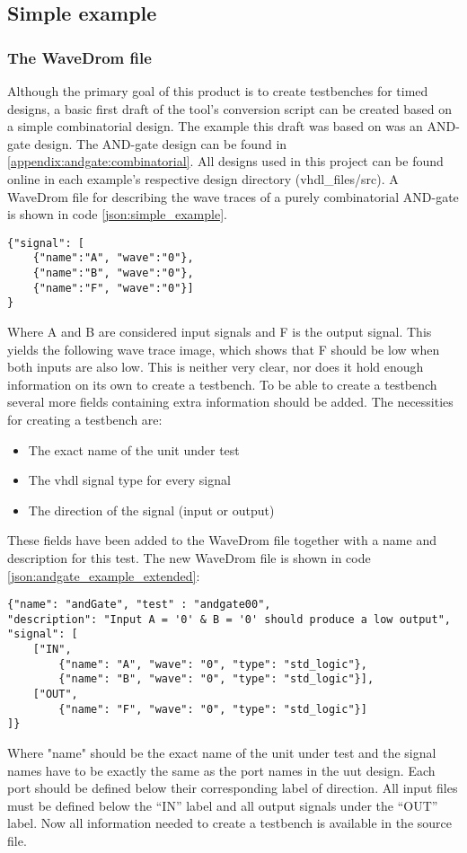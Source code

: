 \subsection{Simple example}
\subsubsection{The WaveDrom file}
Although the primary goal of this product is to create testbenches for timed designs, a basic first draft of the tool's conversion script can be created based on a simple combinatorial design.
\npar
The example this draft was based on was an AND-gate design. The AND-gate design can be found in \ref{appendix:andgate:combinatorial}. All designs used in this project can be found online \cite{examples} in each example's respective design directory (vhdl\_files/src).
\npar
A WaveDrom file for describing the wave traces of a purely combinatorial AND-gate is shown in code \ref{json:simple_example}.
\begin{lstlisting}[style=json, caption={Standard WaveDrom description for a combinatorial AND-gate}, label={json:simple_example}]
{"signal": [
	{"name":"A", "wave":"0"},
	{"name":"B", "wave":"0"},
	{"name":"F", "wave":"0"}]  
}
\end{lstlisting}\noindent
Where A and B are considered input signals and F is the output signal. This yields the following wave trace image, which shows that F should be low when both inputs are also low.%
This is neither very clear, nor does it hold enough information on its own to create a testbench.
To be able to create a testbench several more fields containing extra information should be added.
\npar
The necessities for creating a testbench are:
\begin{itemize}
	\item The exact name of the unit under test
	\item The vhdl signal type for every signal
	\item The direction of the signal (input or output)
\end{itemize}\noindent
These fields have been added to the WaveDrom file together with a name and description for this test. The new WaveDrom file is shown in code \ref{json:andgate_example_extended}:\newpage
\begin{lstlisting}[style=json, caption={Extended WaveDrom description for a combinatorial AND-gate}, label={json:andgate_example_extended}]
{"name": "andGate", "test" : "andgate00", 
"description": "Input A = '0' & B = '0' should produce a low output", 
"signal": [
	["IN",
		{"name": "A", "wave": "0", "type": "std_logic"},
		{"name": "B", "wave": "0", "type": "std_logic"}],
	["OUT",
		{"name": "F", "wave": "0", "type": "std_logic"}]
]}
\end{lstlisting}\noindent
Where "name" should be the exact name of the unit under test and the signal names have to be exactly the same as the port names in the uut design. Each port should be defined below their corresponding label of direction. All input files must be defined below the “IN” label and all output signals under the “OUT” label. Now all information needed to create a testbench is available in the source file.
